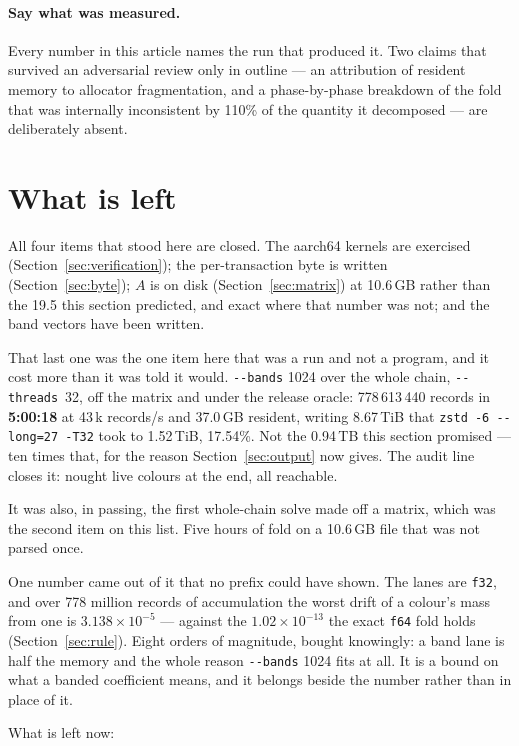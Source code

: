 \documentclass[11pt,a4paper]{article}
\newcommand{\flag}[1]{\texttt{-{}-#1}}
\begin{document}
\paragraph{Say what was measured.} Every number in this article names the run
that produced it. Two claims that survived an adversarial review only in outline
--- an attribution of resident memory to allocator fragmentation, and a
phase-by-phase breakdown of the fold that was internally inconsistent by 110\%
of the quantity it decomposed --- are deliberately absent.

\section{What is left}

All four items that stood here are closed. The aarch64 kernels are exercised
(Section~\ref{sec:verification}); the per-transaction byte is written
(Section~\ref{sec:byte}); $A$ is on disk (Section~\ref{sec:matrix}) at 10.6\,GB
rather than the 19.5 this section predicted, and exact where that number was not;
and the band vectors have been written.

That last one was the one item here that was a run and not a program, and it
cost more than it was told it would. \flag{bands} 1024 over the whole chain,
\flag{threads}~32, off the matrix and under the release oracle: 778\,613\,440
records in \textbf{5:00:18} at 43\,k records/s and 37.0\,GB resident, writing
8.67\,TiB that \texttt{zstd -6 -{}-long=27 -T32} took to 1.52\,TiB, 17.54\%.
Not the 0.94\,TB this section promised --- ten times that, for the reason
Section~\ref{sec:output} now gives. The audit line closes it: nought live
colours at the end, all reachable.

It was also, in passing, the first whole-chain solve made off a matrix, which
was the second item on this list. Five hours of fold on a 10.6\,GB file that
was not parsed once.

One number came out of it that no prefix could have shown. The lanes are
\texttt{f32}, and over 778 million records of accumulation the worst drift of a
colour's mass from one is $3.138\times10^{-5}$ --- against the
$1.02\times10^{-13}$ the exact \texttt{f64} fold holds
(Section~\ref{sec:rule}). Eight orders of magnitude, bought knowingly: a band
lane is half the memory and the whole reason \flag{bands} 1024 fits at all. It
is a bound on what a banded coefficient means, and it belongs beside the number
rather than in place of it.

What is left now:
\end{document}
